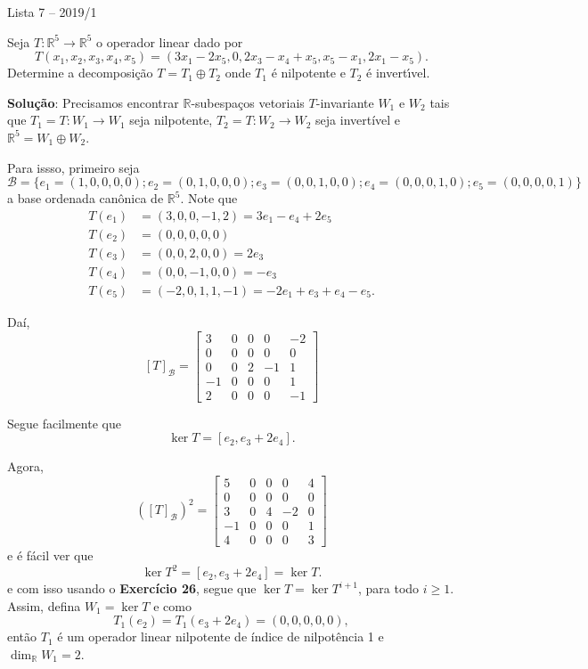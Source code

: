 \documentclass[12pt]{article}
\newcounter{exercicios}
\newcommand{\questao}{
\addtocounter{exercicios}{27}
\noindent{\bf Exerc{\'\i}cio \arabic{exercicios}: }}
\newcommand{\real}{\mathbb{R}}
\begin{document}
\begin{center}
    Lista 7 -- 2019/1
\end{center}
\questao Seja $T : \real^5 \to \real^5$ o operador linear dado por
  \[
      T(x_1,x_2,x_3,x_4,x_5) = (3x_1 -2x_5, 0 , 2x_3 - x_4 + x_5, x_5 - x_1, 2x_1 - x_5).
  \]
  Determine a decomposi\c{c}\~ao $T = T_1 \oplus T_2$ onde $T_1$ \'e nilpotente e $T_2$ \'e invert{\'\i}vel.

\textbf{Solu{\c c}{\~a}o}: Precisamos encontrar $\real$-subespaços vetoriais $T$-invariante $W_1$ e $W_2$ tais que $T_1 = T : W_1 \to W_1$ seja nilpotente, $T_2 = T : W_2 \to W_2$ seja invertível e $\real^5 = W_1 \oplus W_2$.

Para issso, primeiro seja
\[
    \mathcal{B} = \{e_1 = (1,0,0,0,0); e_2 = (0,1,0,0,0); e_3 = (0,0,1,0,0); e_4 = (0,0,0,1,0); e_5 = (0,0,0,0,1)\}
\]
a base ordenada canônica de $\real^5$. Note que
\begin{align*}
	T(e_1) &= (3,0,0,-1,2) = 3e_1 - e_4 + 2e_5\\
	T(e_2) &= (0,0,0,0,0)\\
	T(e_3) &= (0,0,2,0,0) = 2e_3\\
	T(e_4) &= (0,0,-1,0,0) = -e_3\\
	T(e_5) &= (-2,0,1,1,-1) = -2e_1 + e_3 + e_4 - e_5.
\end{align*}

Daí,
\[
    [T]_\mathcal{B} = \begin{bmatrix}
        3 & 0 & 0 & 0 & -2\\
        0 & 0 & 0 & 0 & 0\\
        0 & 0 & 2 & -1 & 1\\
        -1 & 0 & 0 & 0 & 1\\
        2 & 0 & 0 & 0 & -1
    \end{bmatrix}
\]

Segue facilmente que
\[
 	\ker T = [e_2, e_3 + 2e_4].
\]

Agora,
\[
    ([T]_\mathcal{B})^2 = \begin{bmatrix}
        5 & 0 & 0 & 0 & 4\\
        0 & 0 & 0 & 0 & 0\\
        3 & 0 & 4 & -2 & 0\\
        -1 & 0 & 0 & 0 & 1\\
        4 & 0 & 0 & 0 & 3
    \end{bmatrix}
\]
e é fácil ver que
\[
    \ker T^2 = [e_2, e_3 + 2e_4] = \ker T.
\]
e com isso usando o \textbf{Exercício 26}, segue que $\ker T = \ker T^{i + 1}$, para todo $i \ge 1$.
Assim, defina $W_1 = \ker T$ e como
\[
	T_1(e_2) = T_1(e_3 + 2e_4) = (0,0,0,0,0),
\]
então $T_1$ é um operador linear nilpotente de índice de nilpotência 1 e $\dim_\real W_1 = 2$.
\end{document}
